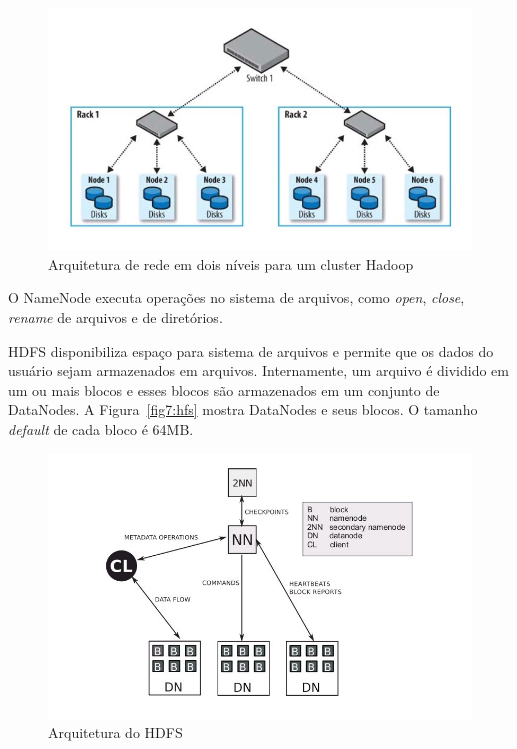     \vspace*{2cm}
    \begin{figure}[h]
      \centering
      \includegraphics[scale=0.6]{figuras/hadoop-cluster.jpg}
      \caption{Arquitetura de rede em dois níveis para um cluster Hadoop~\cite{Hadoop:2010}}
      \label{fig5:hc}
    \end{figure} 

O NameNode executa operações no sistema de arquivos, como \emph{open}, \emph{close}, \emph{rename} de arquivos e de diretórios.

HDFS disponibiliza espaço para sistema de arquivos e permite que os
dados do usuário sejam armazenados em arquivos. Internamente, um
arquivo é dividido em um ou mais blocos e esses blocos são armazenados
em um conjunto de DataNodes. A Figura~\ref{fig7:hfs} mostra DataNodes
e seus blocos. O tamanho \emph{default} de cada bloco é 64MB.

    \vspace*{2cm}
    \begin{figure}[h]
      \centering
      \includegraphics[scale=.6]{figuras/HDFS-arquitetura-2.jpg}
      \caption{Arquitetura do HDFS \cite{TR-IC-10-24}}
      \label{fig6:hfs}
    \end{figure} 


